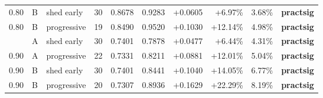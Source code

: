 \begin{table}[h]
{\begin{tabular}{lllrrrrrrl}
0.80 & B & shed early & 30 & 0.8678 & 0.9283 & +0.0605 & +6.97\% & 3.68\% & \textbf{practsig} \\
0.80 & B & progressive & 19 & 0.8490 & 0.9520 & +0.1030 & +12.14\% & 4.98\% & \textbf{practsig} \\
\addlinespace
0.90 & A & shed early & 30 & 0.7401 & 0.7878 & +0.0477 & +6.44\% & 4.31\% & \textbf{practsig} \\
0.90 & A & progressive & 22 & 0.7331 & 0.8211 & +0.0881 & +12.01\% & 5.04\% & \textbf{practsig} \\
0.90 & B & shed early & 30 & 0.7401 & 0.8441 & +0.1040 & +14.05\% & 6.77\% & \textbf{practsig} \\
0.90 & B & progressive & 20 & 0.7307 & 0.8936 & +0.1629 & +22.29\% & 8.19\% & \textbf{practsig} \\
\bottomrule
\end{tabular}%
}
\end{table}

